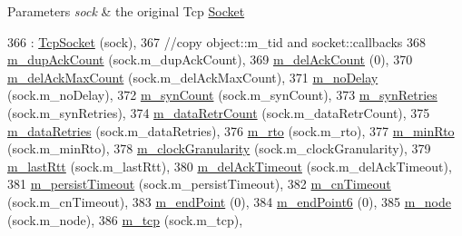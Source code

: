 \begin{DoxyParams}{Parameters}
{\em sock} & the original Tcp \hyperlink{classns3_1_1Socket}{Socket} \\
\hline
\end{DoxyParams}

\begin{DoxyCode}
366   : \hyperlink{classns3_1_1TcpSocket_a70c351707b7af59abb6912cd7d145e60}{TcpSocket} (sock),
367     \textcolor{comment}{//copy object::m\_tid and socket::callbacks}
368     \hyperlink{classns3_1_1TcpSocketBase_a4cf1d54115a5b2c8db34b62b6ccfa541}{m\_dupAckCount} (sock.m\_dupAckCount),
369     \hyperlink{classns3_1_1TcpSocketBase_a7652a3f675c8d56bd5ddc868da70153e}{m\_delAckCount} (0),
370     \hyperlink{classns3_1_1TcpSocketBase_a8a36367ad1e6e7e70827e4c4ba746240}{m\_delAckMaxCount} (sock.m\_delAckMaxCount),
371     \hyperlink{classns3_1_1TcpSocketBase_ad358f0bbed41f6b13d474c49db493223}{m\_noDelay} (sock.m\_noDelay),
372     \hyperlink{classns3_1_1TcpSocketBase_addf20037951e7b85435a97d8885ea844}{m\_synCount} (sock.m\_synCount),
373     \hyperlink{classns3_1_1TcpSocketBase_ac1995a7d30c5175e8f2db539ff288d0f}{m\_synRetries} (sock.m\_synRetries),
374     \hyperlink{classns3_1_1TcpSocketBase_ace7efd32ba5d109037ddd08e128d589d}{m\_dataRetrCount} (sock.m\_dataRetrCount),
375     \hyperlink{classns3_1_1TcpSocketBase_a65d99ef317bd43d9f8a58a34c8fe5faa}{m\_dataRetries} (sock.m\_dataRetries),
376     \hyperlink{classns3_1_1TcpSocketBase_a47788384a59ae230896377ceab6829d4}{m\_rto} (sock.m\_rto),
377     \hyperlink{classns3_1_1TcpSocketBase_a0e95a7381ca2a157516e7f2e86455922}{m\_minRto} (sock.m\_minRto),
378     \hyperlink{classns3_1_1TcpSocketBase_a92035196e6807e1430369bdfdead2e46}{m\_clockGranularity} (sock.m\_clockGranularity),
379     \hyperlink{classns3_1_1TcpSocketBase_a6c48fbea019c593b975bd1d5f5c95dde}{m\_lastRtt} (sock.m\_lastRtt),
380     \hyperlink{classns3_1_1TcpSocketBase_ad7eb8814b40c3d1c26b60df6759748d4}{m\_delAckTimeout} (sock.m\_delAckTimeout),
381     \hyperlink{classns3_1_1TcpSocketBase_a036e720fee99f359c288110f90180a62}{m\_persistTimeout} (sock.m\_persistTimeout),
382     \hyperlink{classns3_1_1TcpSocketBase_a7ee27f03de14c2f9f3d8fcda1e32352e}{m\_cnTimeout} (sock.m\_cnTimeout),
383     \hyperlink{classns3_1_1TcpSocketBase_a78a4181c0a7394749110ea6b194de467}{m\_endPoint} (0),
384     \hyperlink{classns3_1_1TcpSocketBase_ab4b114c3959ee672b4fc9b7a90540dba}{m\_endPoint6} (0),
385     \hyperlink{classns3_1_1TcpSocketBase_abefd2b9f439fe5d0deef93ee68884a1e}{m\_node} (sock.m\_node),
386     \hyperlink{classns3_1_1TcpSocketBase_a26b979e55b02e0aed76cb84c39a66bc7}{m\_tcp} (sock.m\_tcp),

\end{DoxyCode}
